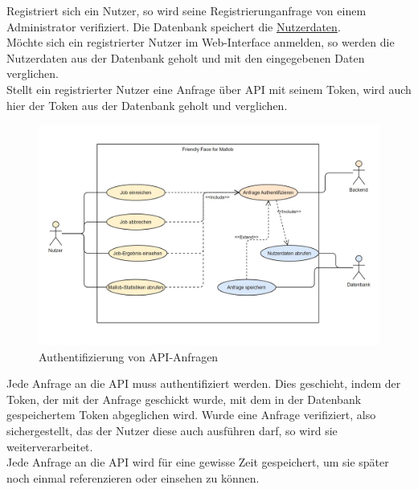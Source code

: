Registriert sich ein Nutzer, so wird seine Registrierunganfrage von einem Administrator verifiziert. Die Datenbank speichert die \hyperref[PD:Nutzerdaten]{Nutzerdaten}.\\
Möchte sich ein registrierter Nutzer im Web-Interface anmelden, so werden die Nutzerdaten aus der Datenbank geholt und mit den eingegebenen Daten verglichen. \\
Stellt ein registrierter Nutzer eine Anfrage über API mit seinem Token, wird auch hier der Token aus der Datenbank geholt und verglichen.
\begin{figure}[H]
    \centering
    \includegraphics[width=\textwidth]{images-interface/Request_authntification_screenshot.jpg}
    \caption{Authentifizierung von API-Anfragen}
\end{figure}
Jede Anfrage an die API muss authentifiziert werden. Dies geschieht, indem der Token, der mit der Anfrage geschickt wurde, mit dem in der Datenbank gespeichertem Token abgeglichen wird. Wurde eine Anfrage verifiziert, also sichergestellt, das der Nutzer diese auch ausführen darf, so wird sie weiterverarbeitet.\\
Jede Anfrage an die API wird für eine gewisse Zeit gespeichert, um sie später noch einmal referenzieren oder einsehen zu können.

\pagebreak


